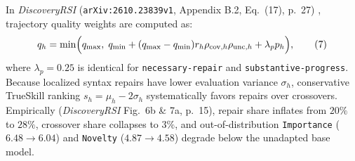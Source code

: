 \documentclass[11pt,a4paper]{article}
\begin{document}
In \emph{DiscoveryRSI} (\texttt{arXiv:2610.23839v1}, Appendix B.2, Eq.~(17), p.~27) \cite{discoveryrsi2026}, trajectory quality weights are computed as:
\begin{equation}
q_h = \min\Bigl(q_{\max},\; q_{\min} + (q_{\max} - q_{\min}) r_h \rho_{\text{cov}, h} \rho_{\text{unc}, h} + \lambda_p p_h\Bigr),
\tag{7}\label{eq:discoveryrsi_eq17}
\end{equation}
where $\lambda_p = 0.25$ is identical for \texttt{necessary-repair} and \texttt{substantive-progress}. Because localized syntax repairs have lower evaluation variance $\sigma_h$, conservative TrueSkill ranking $s_h = \mu_h - 2\sigma_h$ systematically favors repairs over crossovers. Empirically (\emph{DiscoveryRSI} Fig.~6b \& 7a, p.~15), repair share inflates from $20\%$ to $28\%$, crossover share collapses to $3\%$, and out-of-distribution \texttt{Importance} ($6.48 \to 6.04$) and \texttt{Novelty} ($4.87 \to 4.58$) degrade below the unadapted base model.
\end{document}
